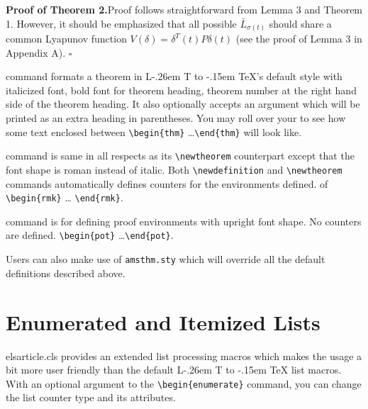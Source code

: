 \documentclass[a4paper,12pt]{article}
\makeatletter
\def\bs{\expandafter\@gobble\string\\}
\def\file#1{\textsf{#1}\xspace}
\DeclareRobustCommand{\LaTeX}{L\kern-.26em%
        {\sbox\z@ T%
         \vbox to\ht\z@{\hbox{\check@mathfonts
           \fontsize\sf@size\z@
           \math@fontsfalse\selectfont
          A\,}%
         \vss}%
        }%
     \kern-.15em%
    \TeX}
\makeatother
\begin{document}
\begin{toolwrite}{15cm}
\noindent\textbf{Proof of Theorem 2.}\enspace Proof follows
straightforward from Lemma 3 and Theorem 1. However, it should be
emphasized that all possible $\bar{L}_{\sigma(t)}$ should share a
common Lyapunov function $V(\delta)=\delta^T(t)P\delta(t)$ (see
the proof of Lemma 3 in Appendix A). \hfill$\square$
\end{toolwrite}

\tooltip{\ttfamily\bs newtheorem}{mytip2} command formats a
theorem in \LaTeX's default style with italicized font, bold font
for theorem heading, theorem number at the right hand side of the
theorem heading.  It also optionally accepts an argument which
will be printed as an extra heading in parentheses. You may roll
over your  to see how some text
enclosed between \verb+\begin{thm}+ \dots \verb+\end{thm}+ will
look like.

\tooltip{\ttfamily\bs newdefinition}{mytip1} command is same in
all respects as its \verb+\newtheorem+ counterpart except that
the font shape is roman instead of italic.  Both
\verb+\newdefinition+ and \verb+\newtheorem+ commands
automatically defines counters for the environments defined.
 of \verb+\begin{rmk}+ \dots
\verb+\end{rmk}+.

\tooltip{\ttfamily\bs newproof}{mytip3} command is for defining
proof environments with upright font shape.  No counters are
defined.  \verb+\begin{pot}+
\dots \verb+\end{pot}+.

Users can also make use of \verb+amsthm.sty+ which will override
all the default definitions described above.

\section{Enumerated and Itemized Lists}
\hypertarget{lists}{}
\file{elsarticle.cls} provides an extended list processing macros
which makes the usage a bit more user friendly than the default
\LaTeX{} list macros.   With an optional argument to the
\verb+\begin{enumerate}+ command, you can change the list counter
type and its attributes.
\end{document}
